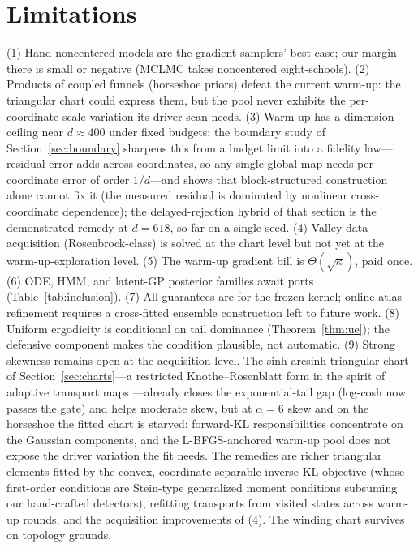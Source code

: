 \documentclass[11pt]{article}
\theoremstyle{remark}
\begin{document}
\section{Limitations}\label{sec:lim}
(1) Hand-noncentered models are the gradient samplers' best case; our
margin there is small or negative (MCLMC takes noncentered
eight-schools). (2) Products of coupled funnels (horseshoe priors)
defeat the current warm-up: the triangular chart could express them,
but the pool never exhibits the per-coordinate scale variation its
driver scan needs. (3) Warm-up has a
dimension ceiling near $d\approx400$ under fixed budgets; the
boundary study of Section~\ref{sec:boundary} sharpens this from a
budget limit into a fidelity law---residual error adds across
coordinates, so any single global map needs per-coordinate error of
order $1/d$---and shows that block-structured construction alone
cannot fix it (the measured residual is dominated by nonlinear
cross-coordinate dependence); the delayed-rejection hybrid of that
section is the demonstrated remedy at $d{=}618$, so far on a single
seed. (4) Valley
data acquisition (Rosenbrock-class) is solved at the chart level but not
yet at the warm-up-exploration level. (5) The warm-up gradient bill is
$\Theta(\sqrt\kappa)$, paid once. (6) ODE, HMM, and latent-GP posterior
families await ports (Table~\ref{tab:inclusion}). (7) All guarantees
are for the frozen kernel; online atlas refinement requires a
cross-fitted ensemble construction left to future work. (8) Uniform
ergodicity is conditional on tail dominance (Theorem~\ref{thm:ue}); the
defensive component makes the condition plausible, not automatic.
(9) Strong skewness remains open at the acquisition level. The
sinh-arcsinh triangular chart of Section~\ref{sec:charts}---a
restricted Knothe--Rosenblatt form in the spirit of adaptive transport
maps \citep{marzouk2016,parno2018}---already closes the
exponential-tail gap (log-cosh now passes the gate) and helps moderate
skew, but at $\alpha{=}6$ skew and on the horseshoe the fitted chart is
starved: forward-KL responsibilities concentrate on the Gaussian
components, and the L-BFGS-anchored warm-up pool does not expose the
driver variation the fit needs. The remedies are richer triangular
elements fitted by the convex, coordinate-separable inverse-KL
objective (whose first-order conditions are Stein-type generalized
moment conditions subsuming our hand-crafted detectors), refitting
transports from visited states across warm-up rounds, and the
acquisition improvements of (4). The winding chart survives on
topology grounds.
\end{document}
